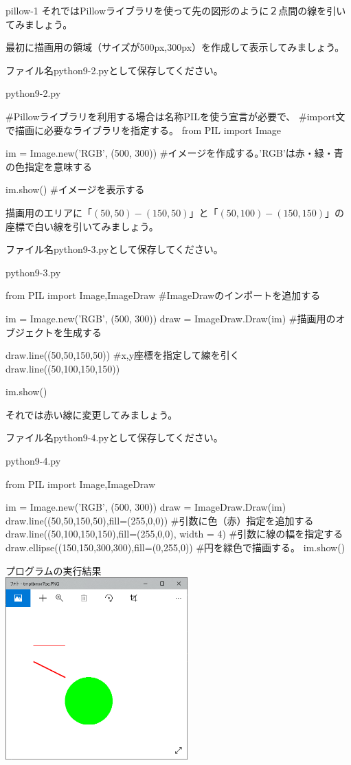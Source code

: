 \documentclass[11pt,a4paper,dvipdfmx,titlepage]{jsreport}
\begin{document}
\begin{pabox}{pillow-1}
それではPillowライブラリを使って先の図形のように２点間の線を引いてみましょう。

最初に描画用の領域（サイズが500px,300px）を作成して表示してみましょう。

ファイル名python9-2.pyとして保存してください。
\begin{codebox}{python9-2.py}
\begin{listing}{1}
#Pillowライブラリを利用する場合は名称PILを使う宣言が必要で、
#import文で描画に必要なライブラリを指定する。
from PIL import Image

im = Image.new('RGB', (500, 300)) #イメージを作成する。'RGB'は赤・緑・青の色指定を意味する

im.show() #イメージを表示する
\end{listing}
\end{codebox}

描画用のエリアに「$(50,50)-(150,50)$」と「$(50,100)-(150,150)$」の座標で白い線を引いてみましょう。


ファイル名python9-3.pyとして保存してください。
\begin{codebox}{python9-3.py}
\begin{listing}{1}
from PIL import Image,ImageDraw #ImageDrawのインポートを追加する

im = Image.new('RGB', (500, 300))
draw = ImageDraw.Draw(im) #描画用のオブジェクトを生成する

draw.line((50,50,150,50)) #x,y座標を指定して線を引く 
draw.line((50,100,150,150))

im.show()
\end{listing}
\end{codebox}

それでは赤い線に変更してみましょう。

ファイル名python9-4.pyとして保存してください。
\begin{codebox}{python9-4.py}
\begin{listing}{1}
from PIL import Image,ImageDraw

im = Image.new('RGB', (500, 300))
draw = ImageDraw.Draw(im)
draw.line((50,50,150,50),fill=(255,0,0)) #引数に色（赤）指定を追加する
draw.line((50,100,150,150),fill=(255,0,0), width = 4)
  #引数に線の幅を指定する
draw.ellipse((150,150,300,300),fill=(0,255,0))
  #円を緑色で描画する。
im.show()
\end{listing}
プログラムの実行結果\\
\includegraphics[width=7cm]{images/drawimage2.png}
\end{codebox}



\end{pabox}
\end{document}

